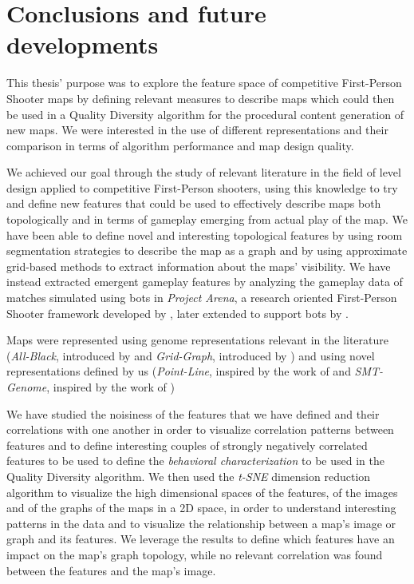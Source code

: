 \chapter{Conclusions and future developments}
\label{ch:conclusions}

This thesis' purpose was to explore the feature space of competitive First-Person Shooter maps by defining relevant measures to describe maps which could then be used in a Quality Diversity algorithm for the procedural content generation of new maps. We were interested in the use of different representations and their comparison in terms of algorithm performance and map design quality.

We achieved our goal through the study of relevant literature in the field of level design applied to competitive First-Person shooters, using this knowledge to try and define new features that could be used to effectively describe maps both topologically and in terms of gameplay emerging from actual play of the map. We have been able to define novel and interesting topological features by using room segmentation strategies to describe the map as a graph and by using approximate grid-based methods to extract information about the maps' visibility. We have instead extracted emergent gameplay features by analyzing the gameplay data of matches simulated using bots in \textit{Project Arena}, a research oriented First-Person Shooter framework developed by \citet{ballabio_online_2018}, later extended to support bots by \citet{bari_evolutionary-based_2023}.

Maps were represented using genome representations relevant in the literature (\textit{All-Black}, introduced by \citet{cardamone_evolving_2011} and \textit{Grid-Graph}, introduced by \citet{bari_evolutionary-based_2023}) and using novel representations defined by us (\textit{Point-Line}, inspired by the work of \citet{olsted_interactive_2015} and \textit{SMT-Genome}, inspired by the work of \citet{whitehead_spatial_2020})

We have studied the noisiness of the features that we have defined and their correlations with one another in order to visualize correlation patterns between features and to define interesting couples of strongly negatively correlated features to be used to define the \textit{behavioral characterization} to be used in the Quality Diversity algorithm. We then used the \textit{t-SNE} dimension reduction algorithm to visualize the high dimensional spaces of the features, of the images and of the graphs of the maps in a 2D space, in order to understand interesting patterns in the data and to visualize the relationship between a map's image or graph and its features. We leverage the results to define which features have an impact on the map's graph topology, while no relevant correlation was found between the features and the map's image.

